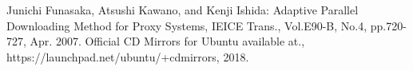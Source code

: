 \documentclass{ltjsarticle}
\begin{document}
\begin{thebibliography}{2}
Junichi Funasaka, Atsushi Kawano, and Kenji Ishida: Adaptive Parallel Downloading Method for Proxy Systems, IEICE Trans., Vol.E90-B, No.4, pp.720-727, Apr. 2007.
Official CD Mirrors for Ubuntu available at., https://launchpad.net/ubuntu/+cdmirrors, 2018.
\end{thebibliography}
\end{document}
